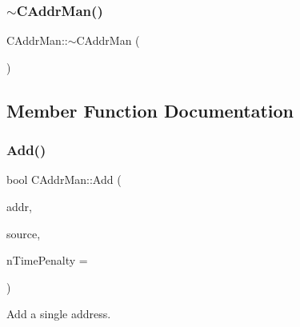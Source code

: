 \mbox{\label{class_c_addr_man_ae1b1838e4de4effbc1fbc888126a9352}} 
\subsubsection{\texorpdfstring{$\sim$\+C\+Addr\+Man()}{~CAddrMan()}}
{\footnotesize\ttfamily C\+Addr\+Man\+::$\sim$\+C\+Addr\+Man (\begin{DoxyParamCaption}{ }\end{DoxyParamCaption})\hspace{0.3cm}{\ttfamily [inline]}}



\subsection{Member Function Documentation}
\mbox{\label{class_c_addr_man_a03fcc7109b5f014760dc50a81f68c5ec}} 
\subsubsection{\texorpdfstring{Add()}{Add()}\hspace{0.1cm}{\footnotesize\ttfamily [1/2]}}
{\footnotesize\ttfamily bool C\+Addr\+Man\+::\+Add (\begin{DoxyParamCaption}\item[{const \mbox{\hyperlink{class_c_address}{C\+Address}} \&}]{addr,  }\item[{const \mbox{\hyperlink{class_c_net_addr}{C\+Net\+Addr}} \&}]{source,  }\item[{int64\+\_\+t}]{n\+Time\+Penalty = {} }\end{DoxyParamCaption})\hspace{0.3cm}{\ttfamily [inline]}}



Add a single address. 

\mbox{\label{class_c_addr_man_aa2ae2abdf710b2d81fa37f072bab028e}} 
